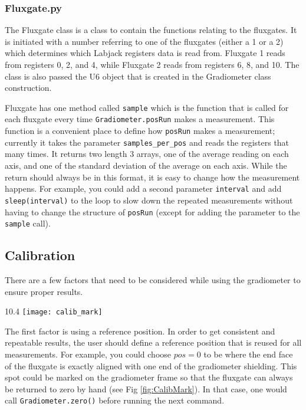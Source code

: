 \documentclass{TheMartianReport}
\newcommand{\pyinline}[1]{\texttt{#1}}
\begin{document}
\subsubsection{Fluxgate.py}
The Fluxgate class is a class to contain the functions relating to the fluxgates. It is initiated with a number referring to one of the fluxgates (either a 1 or a 2) which determines which Labjack registers data is read from. Fluxgate 1 reads from registers 0, 2, and 4, while Fluxgate 2 reads from registers 6, 8, and 10. The class is also passed the U6 object that is created in the Gradiometer class construction.

Fluxgate has one method called \pyinline{sample} which is the function that is called for each fluxgate every time \pyinline{Gradiometer.posRun} makes a measurement. This function is a convenient place to define how \pyinline{posRun} makes a measurement; currently it takes the parameter \pyinline{samples_per_pos} and reads the registers that many times. It returns two length 3 arrays, one of the average reading on each axis, and one of the standard deviation of the average on each axis. While the return should always be in this format, it is easy to change how the measurement happens. For example, you could add a second parameter \pyinline{interval} and add \pyinline{sleep(interval)} to the loop to slow down the repeated measurements without having to change the structure of \pyinline{posRun} (except for adding the parameter to the \pyinline{sample} call).

\subsection{Calibration} \label{subsec:Calibration}
There are a few factors that need to be considered while using the gradiometer to ensure proper results.\begin{wrapfigure}{1}{0.4\textwidth}
	\centering
	\texttt{[image: calib\_mark]}
	\caption{An example of a reference position. The fluxgate mount can be aligned with the mark and zeroed.}
	\label{fig:CalibMark}
\end{wrapfigure}

The first factor is using a reference position. In order to get consistent and repeatable results, the user should define a reference position that is reused for all measurements. For example, you could choose $pos=0$ to be where the end face of the fluxgate is exactly aligned with one end of the gradiometer shielding. This spot could be marked on the gradiometer frame so that the fluxgate can always be returned to zero by hand (see Fig \ref{fig:CalibMark}). In that case, one would call \pyinline{Gradiometer.zero()} before running the next command.
\end{document}
